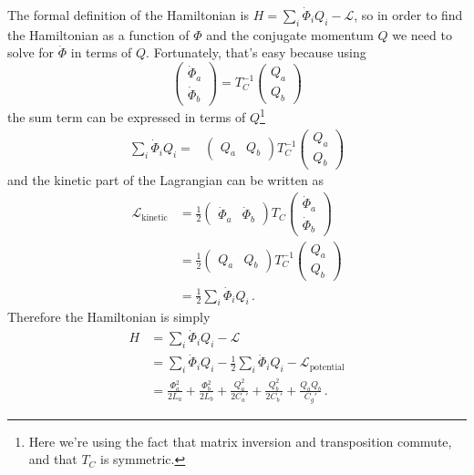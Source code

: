 The formal definition of the Hamiltonian is $H = \sum_i \dot \Phi_i Q_i - \mathcal{L}$, so in order to find the Hamiltonian as a function of $\Phi$ and the conjugate momentum $Q$ we need to solve for $\dot \Phi$ in terms of $Q$.
Fortunately, that's easy because using
\begin{equation*}
  \left( \begin{array}{c} \dot \Phi_a \\ \dot \Phi_b \end{array} \right)
  =
  T_C^{-1}
  \left( \begin{array}{c} Q_a \\ Q_b \end{array} \right)
\end{equation*}
the sum term can be expressed in terms of $Q$\footnote{Here we're using the fact that matrix inversion and transposition commute, and that $T_C$ is symmetric.}
\begin{align*}
  \sum_i \dot \Phi_i Q_i
  =& \left( \begin{array}{cc} Q_a & Q_b \end{array} \right)
  T_C^{-1}
  \left( \begin{array}{c} Q_a \\ Q_b \end{array} \right)
\end{align*}
and the kinetic part of the Lagrangian can be written as
\begin{align*}
  \mathcal{L}_\text{kinetic}
  &= \frac{1}{2}
    \left( \begin{array}{cc} \dot{\Phi}_a & \dot{\Phi}_b \end{array} \right)
    T_C
    \left( \begin{array}{c} \dot{\Phi}_a \\ \dot{\Phi}_b \end{array} \right) \\
  &= \frac{1}{2} 
    \left( \begin{array}{cc} Q_a & Q_b \end{array} \right)
    T_C^{-1}
    \left( \begin{array}{c} Q_a \\ Q_b \end{array} \right) \\
  &= \frac{1}{2} \sum_i \dot \Phi_i Q_i
    \, .
\end{align*}
Therefore the Hamiltonian is simply
\begin{align*}
  H
  &= \sum_i \dot \Phi_i Q_i - \mathcal{L} \\
  &= \sum_i \dot \Phi_i Q_i - \frac{1}{2} \sum_i \dot \Phi_i Q_i - \mathcal{L}_\text{potential} \\
  &=
    \frac{\Phi_a^2}{2 L_a}
  + \frac{\Phi_b^2}{2 L_b}
  + \frac{Q_a^2}{2 C_a'}
  + \frac{Q_b^2}{2 C_b'}
  + \frac{Q_a Q_b}{C_g'} \, .
\end{align*}

